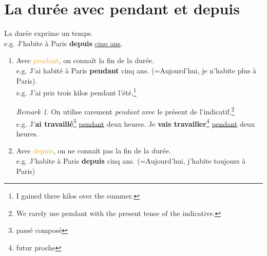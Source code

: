 \documentclass[math,code]{amznotes}
\theoremstyle{remark}
\newtheorem*{remark}{Remark}
\begin{document}
\section{La durée avec pendant et depuis}
La durée exprime un temps. \\
e.g. J'habite à Paris \textbf{depuis} \underline{cinq ans}.
\begin{enumerate}
    \item Avec \textcolor{orange}{pendant}, on connaît la fin de la durée. \\
    e.g. J'ai habité à Paris \textbf{pendant} cinq ans. (=Aujourd'hui, je n'habite plus à Paris). \\
    e.g. J'ai pris trois kilos pendant l’été.\footnote{I gained three kilos over the summer.}
    \begin{notebox}
        \begin{remark}
            On utilise rarement \textit{pendant} avec le présent de l'indicatif.\footnote{We rarely use pendant with the present tense of the indicative.} \\
            e.g. J'\textbf{ai travaillé}\footnote{passé composé} \underline{pendant} deux heures. Je \textbf{vais travailler}\footnote{futur proche} \underline{pendant} deux heures.
        \end{remark}
    \end{notebox}
    \item Avec \textcolor{orange}{depuis}, on ne connaît pas la fin de la durée. \\
    e.g. J'habite à Paris \textbf{depuis} cinq ans. (=Aujourd'hui, j'habite toujours à Paris)
\end{enumerate}
\end{document}
